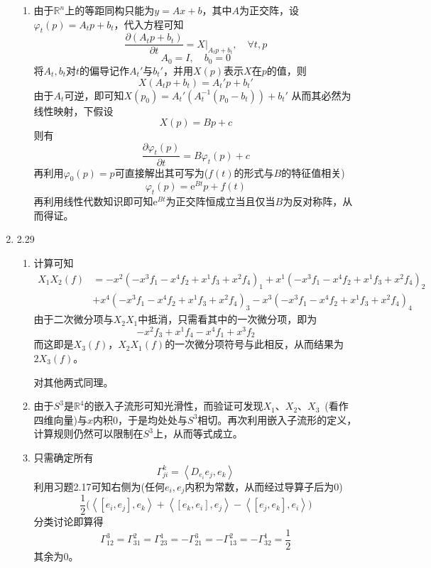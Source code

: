 \documentclass[a4paper,UTF8,fontset=windows,10pt]{ctexart}
\newcommand*{\er}{\mathrm{e}}
\begin{document}
\begin{enumerate}
\begin{enumerate}[(1)]
        \item 由于$\mathbb{R}^n$上的等距同构只能为$y=Ax+b$，其中$A$为正交阵，设$\varphi_t(p)=A_tp+b_t$，代入方程可知
        $$\frac{\partial (A_tp+b_t)}{\partial t}=X\big|_{A_tp+b_t},\quad\forall t,p$$
        $$A_0=I,\quad b_0=0$$
        将$A_t,b_t$对$t$的偏导记作$A_t'$与$b_t'$，并用$X(p)$表示$X$在$p$的值，则
        $$X(A_tp+b_t)=A_t'p+b_t'$$
        由于$A_t$可逆，即可知$X(p_0)=A_t'(A_t^{-1}(p_0-b_t))+b_t'$
        从而其必然为线性映射，下假设
        $$X(p)=Bp+c$$
        则有
        $$\frac{\partial\varphi_t(p)}{\partial t}=B\varphi_t(p)+c$$
        再利用$\varphi_0(p)=p$可直接解出其可写为($f(t)$的形式与$B$的特征值相关)
        $$\varphi_t(p)=\er^{Bt}p+f(t)$$
        再利用线性代数知识即可知$\er^{Bt}$为正交阵恒成立当且仅当$B$为反对称阵，从而得证。
    
    \end{enumerate}
    
    \item 2.29
    \begin{enumerate}[(1)]
        \item 计算可知
        $$\begin{aligned}X_1X_2(f)&=-x^2(-x^3f_1-x^4f_2+x^1f_3+x^2f_4)_1+x^1(-x^3f_1-x^4f_2+x^1f_3+x^2f_4)_2\\ &+x^4(-x^3f_1-x^4f_2+x^1f_3+x^2f_4)_3-x^3(-x^3f_1-x^4f_2+x^1f_3+x^2f_4)_4\end{aligned}$$
        由于二次微分项与$X_2X_1$中抵消，只需看其中的一次微分项，即为
        $$-x^2f_3+x^1f_4-x^4f_1+x^3f_2$$
        而这即是$X_3(f)$，$X_2X_1(f)$的一次微分项符号与此相反，从而结果为$2X_3(f)$。
    
        对其他两式同理。
    
        \item 由于$S^3$是$\mathbb{R}^4$的嵌入子流形可知光滑性，而验证可发现$X_1$、$X_2$、$X_3$\ (看作四维向量)与$x$内积0，于是均处处与$S^3$相切。再次利用嵌入子流形的定义，计算规则仍然可以限制在$S^3$上，从而等式成立。
        
        \item 只需确定所有
        $$\Gamma_{ji}^k=\left<D_{e_i}e_j,e_k\right>$$
        利用习题2.17可知右侧为(任何$e_i,e_j$内积为常数，从而经过导算子后为0)
        $$\frac{1}{2}\big(\left<[e_i,e_j],e_k\right>+\left<[e_k,e_i],e_j\right>-\left<[e_j,e_k],e_i\right>\big)$$
        分类讨论即算得
        $$\Gamma_{12}^3=\Gamma_{31}^2=\Gamma_{23}^1=-\Gamma_{21}^3=-\Gamma_{13}^2=-\Gamma_{32}^1=\frac{1}{2}$$
        其余为0。
    \end{enumerate}
    

\end{enumerate}
\end{document}
